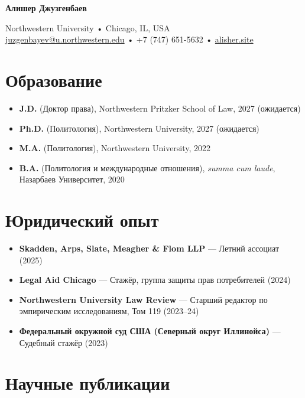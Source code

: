 \documentclass[10pt,a4paper]{article}
\newcommand{\myname}{Алишер Джузгенбаев}
\newcommand{\namefont}[1]{{\normalfont\bfseries\Large{#1}}}
\begin{document}
\pagestyle{empty} %

\begin{center}
    \namefont{\myname}
    
    \vspace{0.3em}
    Northwestern University • Chicago, IL, USA \\
    \href{mailto:juzgenbayev@u.northwestern.edu}{juzgenbayev@u.northwestern.edu} • 
    +7 (747) 651-5632 • 
    \href{https://alisher.site}{alisher.site}
\end{center}

\section{Образование}

\begin{itemize}
    \item[] \textbf{J.D.} (Доктор права), Northwestern Pritzker School of Law, 2027 (ожидается)
    \item[] \textbf{Ph.D.} (Политология), Northwestern University, 2027 (ожидается)
    \item[] \textbf{M.A.} (Политология), Northwestern University, 2022
    \item[] \textbf{B.A.} (Политология и международные отношения), \textit{summa cum laude}, Назарбаев Университет, 2020
\end{itemize}

\section{Юридический опыт}

\begin{itemize}
    \item[] \textbf{Skadden, Arps, Slate, Meagher \& Flom LLP} — Летний ассоциат (2025)
    \item[] \textbf{Legal Aid Chicago} — Стажёр, группа защиты прав потребителей (2024)
    \item[] \textbf{Northwestern University Law Review} — Старший редактор по эмпирическим исследованиям, Том 119 (2023--24)
    \item[] \textbf{Федеральный окружной суд США (Северный округ Иллинойса)} — Судебный стажёр (2023)
\end{itemize}

\section{Научные публикации}
\end{document}
